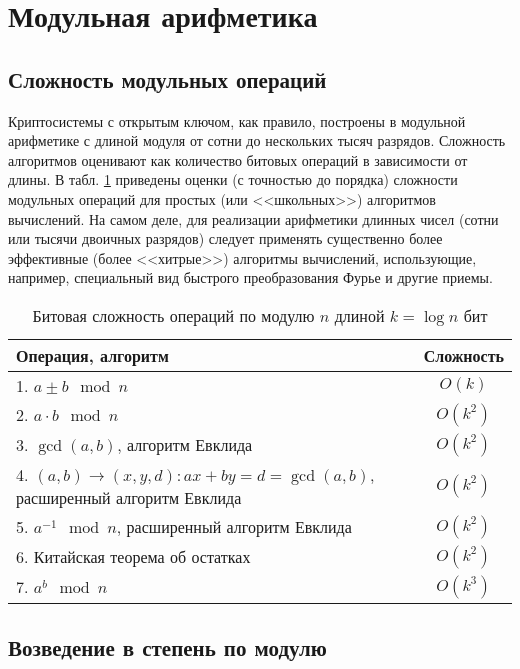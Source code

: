 \section{Модульная арифметика}

\subsection{Сложность модульных операций}

Криптосистемы с открытым ключом, как правило, построены в модульной арифметике с длиной модуля от сотни до нескольких тысяч разрядов. Сложность алгоритмов оценивают как количество битовых операций в зависимости от длины. В табл. \ref{tab:mod-binary-complexity} приведены оценки (с точностью до порядка) сложности модульных операций для простых (или <<школьных>>) алгоритмов вычислений. На самом деле, для реализации арифметики длинных чисел (сотни или тысячи двоичных разрядов) следует применять существенно более эффективные (более <<хитрые>>) алгоритмы вычислений, использующие, например, специальный вид быстрого преобразования Фурье и другие приемы.

\begin{table}[!ht]
    \centering
    \caption{Битовая сложность операций по модулю $n$ длиной $k= \log n$ бит\label{tab:mod-binary-complexity}}
    \begin{tabular}{| p{} | c |}
        \hline
        Операция, алгоритм & Сложность \\
        \hline
        1. $a \pm b \mod n$ & $O(k)$ \\
        2. $a \cdot b \mod n$ & $O(k^2)$ \\
        3. $\gcd(a, b)$, алгоритм Евклида & $O(k^2)$ \\
        4. $(a,b) \rightarrow (x,y,d) : ax + by = d = \gcd(a,b)$, расширенный алгоритм Евклида & $O(k^2)$ \\
        5. $a^{-1} \mod n$, расширенный алгоритм Евклида & $O(k^2)$ \\
        6. Китайская теорема об остатках & $O(k^2)$ \\
        7. $a^b \mod n$ & $O(k^3)$ \\
        \hline
    \end{tabular}

\end{table}

\subsection{Возведение в степень по модулю}

